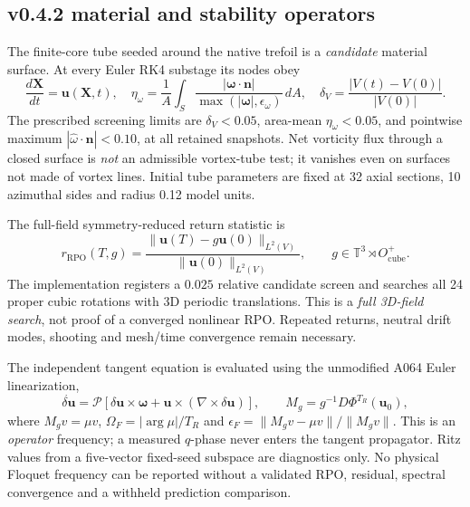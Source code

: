 \documentclass[11pt,a4paper]{article}
\begin{document}
\subsection*{v0.4.2 material and stability operators}
The finite-core tube seeded around the native trefoil is a \emph{candidate} material
surface.  At every Euler RK4 substage its nodes obey
\begin{equation}
\frac{d\mathbf X}{dt}=\mathbf u(\mathbf X,t),\quad
\eta_{\omega}=\frac1A\int_S\frac{|\bm\omega\cdot\mathbf n|}{\max(|\bm\omega|,\epsilon_{\omega})}\,dA,\quad
\delta_V=\frac{|V(t)-V(0)|}{|V(0)|}.
\end{equation}
The prescribed screening limits are $\delta_V<0.05$, area-mean
$\eta_{\omega}<0.05$, and pointwise maximum $|\widehat\omega\cdot\mathbf n|<0.10$,
at all retained snapshots.  Net vorticity flux through a closed surface is
\emph{not} an admissible vortex-tube test; it vanishes even on surfaces not
made of vortex lines.  Initial tube parameters are fixed at 32 axial
sections, 10 azimuthal sides and radius 0.12 model units.

The full-field symmetry-reduced return statistic is
\begin{equation}
 r_{\mathrm{RPO}}(T,g)=\frac{\|\mathbf u(T)-g\mathbf u(0)\|_{L^2(V)}}
 {\|\mathbf u(0)\|_{L^2(V)}},\qquad
 g\in\mathbb T^3\rtimes O^{+}_{\mathrm{cube}}.
\end{equation}
The implementation registers a $0.025$ relative candidate screen and searches
all 24 proper cubic rotations with 3D periodic translations.  This is a
\emph{full 3D-field search}, not proof of a converged nonlinear RPO.
Repeated returns, neutral drift modes, shooting and mesh/time convergence
remain necessary.

The independent tangent equation is evaluated using the unmodified A064
Euler linearization,
\begin{equation}
\dot{\delta\mathbf u}=\mathcal P[\delta\mathbf u\times\bm\omega+
\mathbf u\times(\nabla\times\delta\mathbf u)],\qquad
M_g=g^{-1}D\Phi^{T_R}(\mathbf u_0),
\end{equation}
where $M_gv=\mu v$, $\Omega_F=|\arg\mu|/T_R$ and
$\epsilon_F=\|M_gv-\mu v\|/\|M_gv\|$.  This is an \emph{operator}
frequency; a measured $q$-phase never enters the tangent propagator.
Ritz values from a five-vector fixed-seed subspace are diagnostics only.
No physical Floquet frequency can be reported without a validated RPO,
residual, spectral convergence and a withheld prediction comparison.

\end{document}
